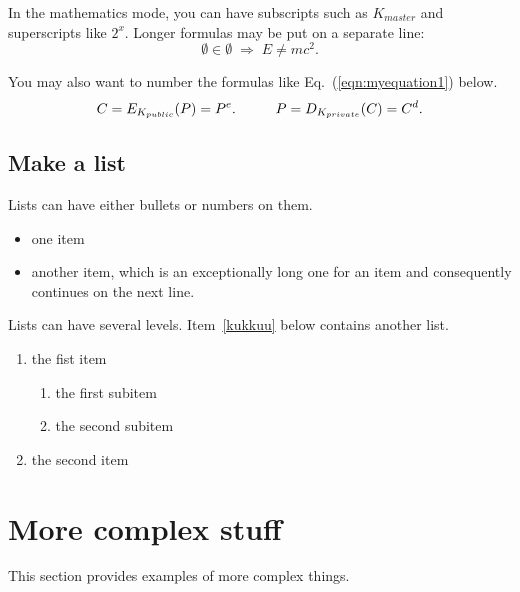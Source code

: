 \documentclass{cseminar}
\begin{document}
In the mathematics mode, you can have subscripts such as $K_{master}$
and superscripts like $2^x$. Longer formulas may be put on a separate
line:
\[ \emptyset \in \emptyset \; \Rightarrow \; E \neq mc^2. \]

You may also want to number the formulas like Eq.~(\ref{eqn:myequation1})
below.
\begin{equation}\label{eqn:myequation1}
C = E_{K_{public}}(P) = P^e. \hspace{10mm}   P = D_{K_{private}}(C) = C^d.
\end{equation}





\subsection{Make a list}
\label{sec:list}

Lists can have either bullets or numbers on them. 

\begin{itemize}
\item one item
\item another item, which is an exceptionally long one for an item
  and consequently continues on the next line.
\end{itemize}

Lists can have several levels. Item~\ref{kukkuu} below contains
another list.
\begin{enumerate}
\item the fist item \label{kukkuu}
  \begin{enumerate}
  \item the first subitem 
  \item the second subitem
  \end{enumerate}
\item the second item
\end{enumerate}




\section{More complex stuff}

This section provides examples of more complex things.


\end{document}
